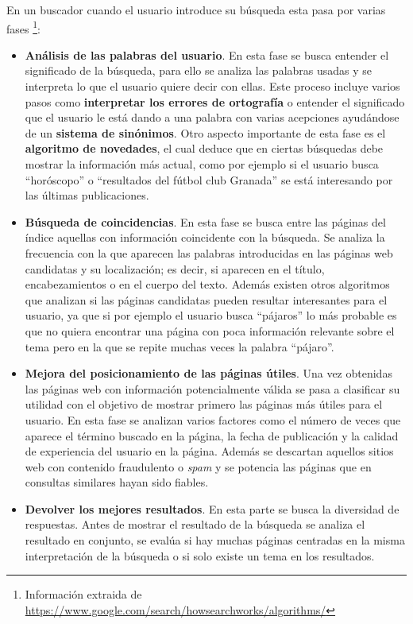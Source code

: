 \documentclass[size=a4, parskip=half, titlepage=false, toc=flat, toc=bib, 12pt, twoside]{scrartcl}
\theoremstyle{theorem-style}
\theoremstyle{definition-style}
\theoremstyle{remark-style}
\theoremstyle{example-style}
\theoremstyle{definition-style}
\theoremstyle{remark-style}
\begin{document}
En un buscador cuando el usuario introduce su búsqueda esta pasa por varias fases \footnote{Información extraida de \url{https://www.google.com/search/howsearchworks/algorithms/}}:
\begin{itemize}
\item \textbf{Análisis de las palabras del usuario}. En esta fase se busca entender el significado de la búsqueda, para ello se analiza las palabras usadas y se interpreta lo que el usuario quiere decir con ellas. Este proceso incluye varios pasos como \textbf{interpretar los errores de ortografía} o entender el significado que el usuario le está dando a una palabra con varias acepciones ayudándose de un \textbf{sistema de sinónimos}. Otro aspecto importante de esta fase es el \textbf{algoritmo de novedades}, el cual deduce que en ciertas búsquedas debe mostrar la información más actual, como por ejemplo si el usuario busca ``horóscopo'' o ``resultados del fútbol club Granada'' se está interesando por las últimas publicaciones.
\item \textbf{Búsqueda de coincidencias}. En esta fase se busca entre las páginas del índice aquellas con información coincidente con la búsqueda. Se analiza la frecuencia con la que aparecen las palabras introducidas en las páginas web candidatas y su localización; es decir, si aparecen en el título, encabezamientos o en el cuerpo del texto. Además existen otros algoritmos que analizan si las páginas candidatas pueden resultar interesantes para el usuario, ya que si por ejemplo el usuario busca ``pájaros'' lo más probable es que no quiera encontrar una página con poca información relevante sobre el tema pero en la que se repite muchas veces la palabra ``pájaro''.
\item \textbf{Mejora del posicionamiento de las páginas útiles}. Una vez obtenidas las páginas web con información potencialmente válida se pasa a clasificar su utilidad con el objetivo de mostrar primero las páginas más útiles para el usuario. En esta fase se analizan varios factores como el número de veces que aparece el término buscado en la página, la fecha de publicación y la calidad de experiencia del usuario en la página. Además se descartan aquellos sitios web con contenido fraudulento o \textit{spam} y se potencia las páginas que en consultas similares hayan sido fiables.
\item \textbf{Devolver los mejores resultados}. En esta parte se busca la diversidad de respuestas. Antes de mostrar el resultado de la búsqueda se analiza el resultado en conjunto, se evalúa si hay muchas páginas centradas en la misma interpretación de la búsqueda o si solo existe un tema en los resultados.

\end{itemize}
\end{document}
